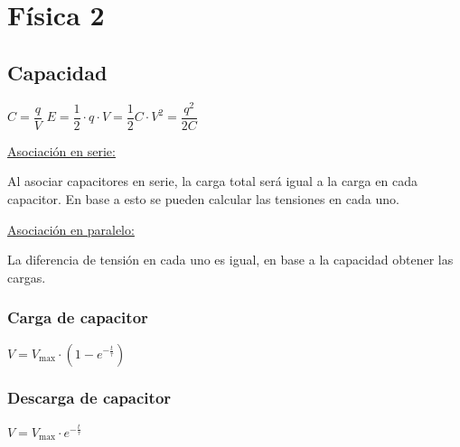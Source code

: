 \section{Física 2}

\subsection{Capacidad}

\hfil
$C = \dfrac{q}{V}$
\hfil
$E = \dfrac{1}{2}\cdot q \cdot V = \dfrac{1}{2} C \cdot V^2 = \dfrac{q^2}{2C}$
\hfil

\vspace{\baselineskip}
\noindent
\underline{Asociación en serie:}

Al asociar capacitores en serie, la carga total será igual a la carga en cada capacitor. En base a esto se pueden calcular las tensiones en cada uno.

\vspace{\baselineskip}
\noindent
\underline{Asociación en paralelo:}

La diferencia de tensión en cada uno es igual, en base a la capacidad obtener las cargas.

\begin{multicols}{2}
    \subsubsection*{Carga de capacitor}    
    \hfil
    $V = V_{\max} \cdot \left(1-e^{-\frac{t}{\tau}} \right)$
    \hfil

    \subsubsection*{Descarga de capacitor}
    \hfil
    $V = V_{\max} \cdot e^{-\frac{t}{\tau}}$
    \hfil
\end{multicols}
